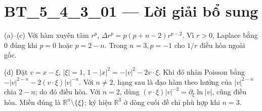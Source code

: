 \documentclass[10pt,a4paper]{article}
\begin{document}
\section*{BT\_5\_4\_3\_01 — Lời giải bổ sung}
(a)--(c) Với hàm xuyên tâm $r^p$, $\Delta r^p=p(p+n-2)r^{p-2}$. Vì $r>0$, Laplace bằng 0 đúng khi $p=0$ hoặc $p=2-n$. Trong $n=3,p=-1$ cho $1/r$ điều hòa ngoài gốc.

(d) Đặt $v=x-\xi$, $|\xi|=1$, $1-|x|^2=-|v|^2-2v\cdot\xi$. Khi đó nhân Poisson bằng $-|v|^{2-n}-2(v\cdot\xi)|v|^{-n}$. Với $n\ne2$, hạng sau là đạo hàm theo hướng của $|v|^{2-n}$ chia $2-n$; do đó điều hòa. Với $n=2$, dùng $(v\cdot\xi)|v|^{-2}=\partial_\xi\ln|v|$, cũng điều hòa. Miền đúng là $\mathbb R^n\setminus\{\xi\}$; ký hiệu $\mathbb R^3$ ở dòng cuối đề chỉ phù hợp khi $n=3$.
\end{document}
